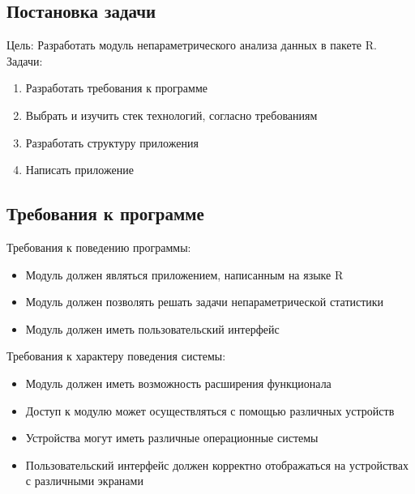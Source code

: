 \documentclass[14pt,a4paper]{scrartcl}
\begin{document}
    \subsection{Постановка задачи}
    Цель: Разработать модуль непараметрического анализа данных в пакете R.\\
    Задачи:
    \begin{enumerate}
        \item Разработать требования к программе
        \item Выбрать и изучить стек технологий, согласно требованиям
        \item Разработать структуру приложения
        \item Написать приложение
    \end{enumerate}

    \subsection{Требования к программе}
    Требования к поведению программы:
    \begin{itemize}
        \item Модуль должен являться приложением, написанным на языке R
        \item Модуль должен позволять решать задачи непараметрической статистики
        \item Модуль должен иметь пользовательский интерфейс
    \end{itemize}
    Требования к характеру поведения системы:
    \begin{itemize}
        \item Модуль должен иметь возможность расширения функционала
        \item Доступ к модулю может осуществляться с помощью различных устройств
        \item Устройства могут иметь различные операционные системы
        \item Пользовательский интерфейс должен корректно отображаться на устройствах с различными экранами
    \end{itemize}
\end{document}
